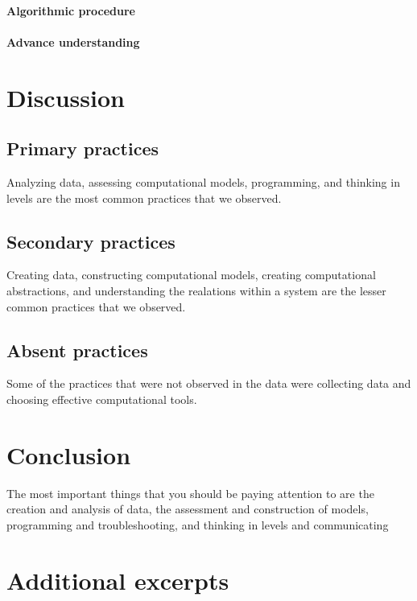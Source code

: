 \documentclass{msuphddissertation}
\begin{document}
\begin{doublespace}
\subsubsection{Algorithmic procedure}

\subsubsection{Advance understanding}

%
%

\chapter{Discussion}\label{CH6:Discussion}


\section{Primary practices}

Analyzing data, assessing computational models, programming, and thinking in levels are the most common practices that we observed.

\section{Secondary practices}

Creating data, constructing computational models, creating computational abstractions, and understanding the realations within a system are the lesser common practices that we observed.

\section{Absent practices}

Some of the practices that were not observed in the data were collecting data and choosing effective computational tools.

%
%

\chapter{Conclusion}\label{CH7:Conclusion}

The most important things that you should be paying attention to are the creation and analysis of data, the assessment and construction of models, programming and troubleshooting, and thinking in levels and communicating

%
%

\appendices

\chapter{Additional excerpts}

%
%

\end{doublespace}



\end{document}
